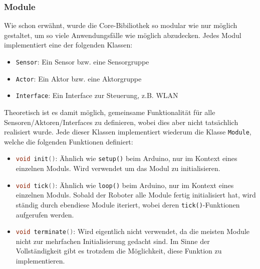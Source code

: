 \subsubsection{Module}
\label{subsec:software_common_modules}
Wie schon erwähnt,
wurde die Core-Bibiliothek so modular wie nur möglich gestaltet,
um so viele Anwendungsfälle wie möglich abzudecken.
%
Jedes Modul implementiert eine der folgenden Klassen:
\begin{itemize}
    \item \texttt{Sensor}: Ein Sensor bzw. eine Sensorgruppe
    \item \texttt{Actor}: Ein Aktor bzw. eine Aktorgruppe
    \item \texttt{Interface}: Ein Interface zur Steuerung, z.B. WLAN
\end{itemize}
Theoretisch ist es damit möglich,
gemeinsame Funktionalität für alle Sensoren/Aktoren/Interfaces zu definieren,
wobei dies aber nicht tatsächlich realisiert wurde.
%
Jede dieser Klassen implementiert wiederum die Klasse \texttt{Module},
welche die folgenden Funktionen definiert:
\begin{itemize}
    \item \lstinline[language=c]|void init()|:
        Ähnlich wie \texttt{setup()} beim Arduino, nur im Kontext eines einzelnen Moduls.
        Wird verwendet um das Modul zu initialisieren.
    \item \lstinline[language=c]|void tick()|:
        Ähnlich wie \texttt{loop()} beim Arduino, nur im Kontext eines einzelnen Moduls.
        Sobald der Roboter alle Module fertig initialisiert hat,
        wird ständig durch ebendiese Module iteriert,
        wobei deren \texttt{tick()}-Funktionen aufgerufen werden. 
    \item \lstinline[language=c]|void terminate()|:
        Wird eigentlich nicht verwendet,
        da die meisten Module nicht zur mehrfachen Initialisierung gedacht sind.
        Im Sinne der Vollständigkeit gibt es trotzdem die Möglichkeit,
        diese Funktion zu implementieren.
\end{itemize}

